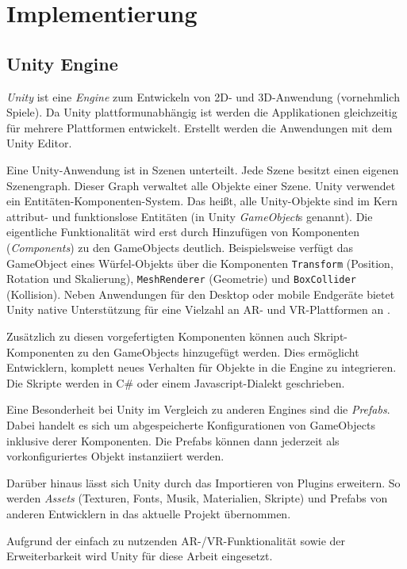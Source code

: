 \chapter{Implementierung}
\label{chap:implementation}

\section{Unity Engine}
\emph{Unity} \autocite{UnityTechnologies2018} ist eine \emph{Engine} zum Entwickeln von 2D- und 3D-Anwendung (vornehmlich Spiele).
Da Unity plattformunabhängig ist werden die Applikationen gleichzeitig für mehrere Plattformen entwickelt.
Erstellt werden die Anwendungen mit dem Unity Editor.

Eine Unity-Anwendung ist in Szenen unterteilt.
Jede Szene besitzt einen eigenen Szenengraph.
Dieser Graph verwaltet alle Objekte einer Szene.
Unity verwendet ein Entitäten-Komponenten-System.
Das heißt, alle Unity-Objekte sind im Kern attribut- und funktionslose Entitäten (in Unity \emph{GameObject}s genannt).
Die eigentliche Funktionalität wird erst durch Hinzufügen von Komponenten (\emph{Components}) zu den GameObjects deutlich.
Beispielsweise verfügt das GameObject eines Würfel-Objekts über die Komponenten \texttt{Transform} (Position, Rotation und Skalierung), \texttt{MeshRenderer} (Geometrie) und \texttt{BoxCollider} (Kollision).
Neben Anwendungen für den Desktop oder mobile Endgeräte bietet Unity native Unterstützung für eine Vielzahl an AR- und VR-Plattformen an \parencite{UnityTechnologies2018b}.

Zusätzlich zu diesen vorgefertigten Komponenten können auch Skript-Komponenten zu den GameObjects hinzugefügt werden.
Dies ermöglicht Entwicklern, komplett neues Verhalten für Objekte in die Engine zu integrieren.
Die Skripte werden in C\# oder einem Javascript-Dialekt geschrieben.

Eine Besonderheit bei Unity im Vergleich zu anderen Engines sind die \emph{Prefabs}.
Dabei handelt es sich um abgespeicherte Konfigurationen von GameObjects inklusive derer Komponenten.
Die Prefabs können dann jederzeit als vorkonfiguriertes Objekt instanziiert werden.

Darüber hinaus lässt sich Unity durch das Importieren von Plugins erweitern.
So werden \emph{Assets} (Texturen, Fonts, Musik, Materialien, Skripte) und Prefabs von anderen Entwicklern in das aktuelle Projekt übernommen.

Aufgrund der einfach zu nutzenden AR-/VR-Funktionalität sowie der Erweiterbarkeit wird Unity für diese Arbeit eingesetzt.

